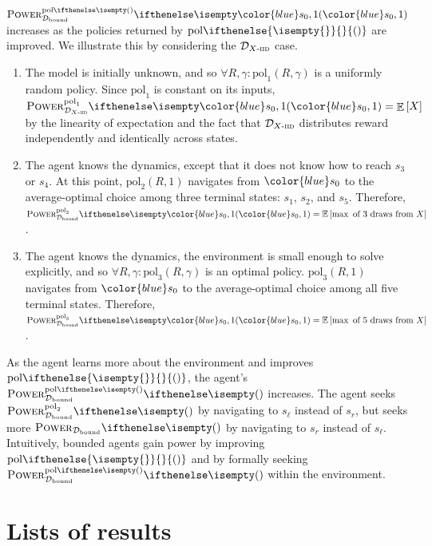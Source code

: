 \documentclass{article}
\newcommand*{\prn}[1]{\left(#1\right)}
\newcommand*{\brx}[1]{\left[#1\right]}
\newcommand*{\prnNotEmpty}[1]{\ifthenelse{\isempty{#1}}
    {}
    {\prn{#1}}
}
\newcommand*{\Dist}{X} %
\DeclareMathOperator*{\opE}{\mathbb{E}}
\newcommand*{\EX}{\opE\brx{\Dist}}
\newcommand*{\pol}[1][R,\gamma]{\text{pol}\prnNotEmpty{#1}}
\newcommand*{\col}[2]{{\color{#1}#2}}
\theoremstyle{definition}
\begin{document}
\begin{appendices}
$\pwrPol{\col{blue}{s_0},1}$ increases as the policies returned by $\pol[]$ are improved. We illustrate this by considering the $\Diid$ case.

\begin{enumerate}
\item[$\text{pol}_1$] The model is initially unknown, and so $\forall R,\gamma:\text{pol}_1(R,\gamma)$ is a uniformly random policy. Since $\text{pol}_1$ is constant on its inputs, $\pwrPol[\text{pol}_1][\Diid]{\col{blue}{s_0},1}=\EX$ by the linearity of expectation and the fact that $\Diid$ distributes reward independently and identically across states.
\item[$\text{pol}_2$] The agent knows the dynamics, except that it does not know how to reach $s_3$ or $s_4$. At this point, $\text{pol}_2(R,1)$ navigates from $\col{blue}{s_0}$ to the average-optimal choice among three terminal states: $s_1$, $s_2$, and $s_5$. Therefore, $\pwrPol[\text{pol}_2]{\col{blue}{s_0},1}=\Edraws{3}$. 
\item[$\text{pol}_3$] The agent knows the dynamics, the environment is small enough to solve explicitly, and so $\forall R,\gamma:\text{pol}_3(R,\gamma)$ is an optimal policy. $\text{pol}_3(R,1)$ navigates from $\col{blue}{s_0}$ to the average-optimal choice among all five terminal states. Therefore, $\pwrPol[\text{pol}_3]{\col{blue}{s_0},1}=\Edraws{5}$.
\end{enumerate}

As the agent learns more about the environment and improves $\pol[]$, the agent's $\pwrPol{}$ increases. The agent seeks $\pwrPol[\text{pol}_2]{}$ by navigating to $s_\ell$ instead of $s_r$, but seeks more $\pwr$ by navigating to $s_r$ instead of $s_\ell$. Intuitively, bounded agents gain power by improving $\pol[]$ and by formally seeking $\pwrPol{}$ within the environment.


\section{Lists of results}\label{app:thms}

\renewcommand\listtheoremname{List of definitions}
\listoftheorems[ignoreall, show={definition}]  

\renewcommand\listtheoremname{List of theorems}
\listoftheorems[]  


\end{appendices}
\end{document}
